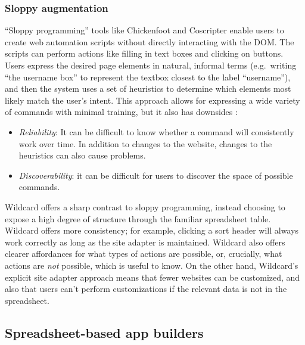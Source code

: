 \documentclass[english,submission]{programming}
\providecommand{\tightlist}{%
  \setlength{\itemsep}{0pt}\setlength{\parskip}{0pt}}
\begin{document}
\hypertarget{sloppy-augmentation}{%
\subsubsection{Sloppy augmentation}\label{sloppy-augmentation}}

``Sloppy programming'' \autocite{little2010} tools like Chickenfoot
\autocite{bolin2005} and Coscripter \autocite{leshed2008} enable users
to create web automation scripts without directly interacting with the
DOM. The scripts can perform actions like filling in text boxes and
clicking on buttons. Users express the desired page elements in natural,
informal terms (e.g.~writing ``the username box'' to represent the
textbox closest to the label ``username''), and then the system uses a
set of heuristics to determine which elements most likely match the
user's intent. This approach allows for expressing a wide variety of
commands with minimal training, but it also has downsides
\autocite{little2010}:

\begin{itemize}
\tightlist
\item
  \emph{Reliability}: It can be difficult to know whether a command will
  consistently work over time. In addition to changes to the website,
  changes to the heuristics can also cause problems.
\item
  \emph{Discoverability}: it can be difficult for users to discover the
  space of possible commands.
\end{itemize}

Wildcard offers a sharp contrast to sloppy programming, instead choosing
to expose a high degree of structure through the familiar spreadsheet
table. Wildcard offers more consistency; for example, clicking a sort
header will always work correctly as long as the site adapter is
maintained. Wildcard also offers clearer affordances for what types of
actions are possible, or, crucially, what actions are \emph{not}
possible, which is useful to know. On the other hand, Wildcard's
explicit site adapter approach means that fewer websites can be
customized, and also that users can't perform customizations if the
relevant data is not in the spreadsheet.

\hypertarget{spreadsheet-based-app-builders}{%
\subsection{Spreadsheet-based app
builders}\label{spreadsheet-based-app-builders}}
\end{document}
